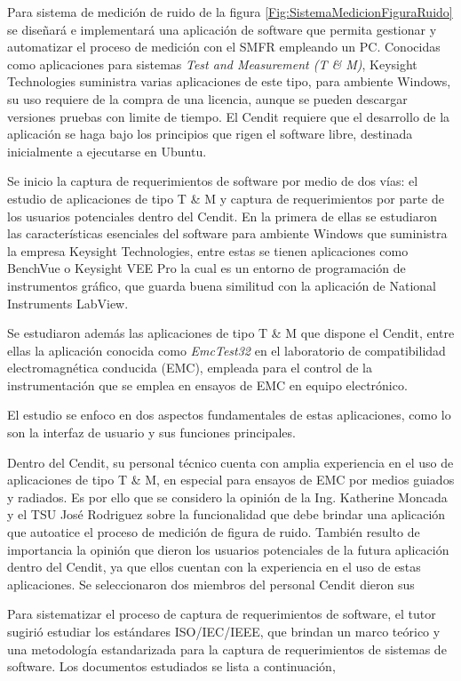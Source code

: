 \documentclass[paper=letter,oneside,fontsize=12pt, parskip=full]{article}
\begin{document}
	Para sistema de medición de ruido de la figura \ref{Fig:SistemaMedicionFiguraRuido} se diseñará e implementará una aplicación de software que permita gestionar y automatizar el proceso de medición con el SMFR empleando un PC. Conocidas como aplicaciones para sistemas \emph{Test and Measurement (T \& M)}, Keysight Technologies suministra varias aplicaciones de este tipo, para ambiente Windows, su uso requiere de la compra de una licencia, aunque se pueden descargar versiones pruebas con limite de tiempo. El Cendit requiere que el desarrollo de la aplicación se haga bajo los principios que rigen el software libre, destinada inicialmente a ejecutarse en Ubuntu.	
	
	Se inicio la captura de requerimientos de software por medio de dos vías: el estudio de aplicaciones de tipo T & M y captura de requerimientos por parte de los usuarios potenciales dentro del Cendit. En la primera de ellas se estudiaron las características esenciales del software para ambiente Windows que suministra la empresa Keysight Technologies, entre estas se tienen aplicaciones como BenchVue o Keysight VEE Pro la cual es un entorno de programación de instrumentos gráfico, que  guarda buena similitud con la aplicación de National Instruments LabView. 	
	
	Se estudiaron además las aplicaciones de tipo T \& M que dispone el Cendit, entre ellas la aplicación conocida como \emph{EmcTest32} en el laboratorio de compatibilidad electromagnética conducida (EMC), empleada para el control de la instrumentación que se emplea en ensayos de EMC en equipo electrónico.
	
	El estudio se enfoco en dos aspectos fundamentales de estas aplicaciones, como lo son la interfaz de usuario y sus funciones principales. 
	
	Dentro del Cendit, su personal técnico cuenta con amplia experiencia en el uso de aplicaciones de tipo T \& M, en especial para ensayos de EMC por medios guiados y radiados. Es por ello que se considero la opinión de la Ing. Katherine Moncada y el TSU José Rodriguez sobre la funcionalidad que debe brindar una aplicación que autoatice el proceso de medición de figura de ruido.  También resulto de importancia la opinión que dieron los usuarios potenciales de la futura aplicación dentro del Cendit, ya que ellos cuentan con la experiencia en el uso de estas aplicaciones. Se seleccionaron dos miembros del personal Cendit dieron sus 	

	Para sistematizar el proceso de captura de requerimientos de software, el tutor sugirió estudiar los estándares ISO/IEC/IEEE, que brindan un marco teórico y una metodología estandarizada para la captura de requerimientos de sistemas de software. Los documentos estudiados se lista a continuación,
	
\end{document}
